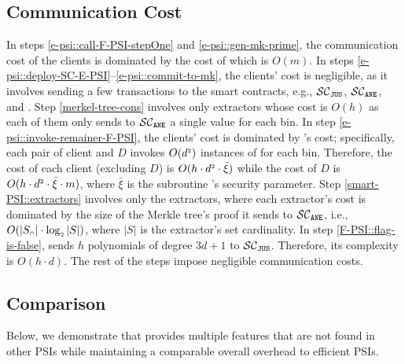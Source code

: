 

\vspace{-5mm}
\subsection{Communication Cost}

\vspace{-2mm}

In steps  \ref{e-psi::call-F-PSI-stepOne} and \ref{e-psi::gen-mk-prime}, the communication cost of the clients is dominated by the cost of \ct which is $O(m)$. In steps \ref{e-psi::deploy-SC-E-PSI}--\ref{e-psi::commit-to-mk}, the clients' cost is negligible, as it involves sending a few transactions to the smart contracts, e.g., $\mathcal{SC}_{\mathtt{JUS}}$, $\mathcal{SC}_{\mathtt{ANE}}$, and \SCpc. Step \ref{merkel-tree-cons} involves only extractors whose cost is $O(h)$ as each of them only sends to $\mathcal{SC}_{\mathtt{ANE}}$  a single value for each bin. In step \ref{e-psi::invoke-remainer-F-PSI}, the clients' cost is dominated by \vopr's cost; specifically, each pair of client and $D$ invokes $O(d^{\scriptscriptstyle 2})$ instances of \vopr for each bin. Therefore, the cost of each client (excluding $D$) is $O(h\cdot d^{\scriptscriptstyle 2}\cdot \bar\xi)$ while the cost of $D$ is $O(h\cdot d^{\scriptscriptstyle 2}\cdot \bar\xi\cdot m)$, where $\bar\xi$ is the subroutine \ole's security parameter. 
%
Step \ref{smart-PSI::extractors}  involves only the extractors, where each extractor's cost is dominated by the size of the Merkle tree's proof it sends to $\mathcal{SC}_{\mathtt{ANE}}$, i.e., $O(|S_{\scriptscriptstyle\cap}|\cdot \log_{\scriptscriptstyle 2}|S|)$, where $|S|$ is the extractor's set cardinality. 
%
In step \ref{F-PSI::flag-is-false}, \aud sends $h$ polynomials of degree $3d+1$ to $\mathcal{SC}_{\mathtt{JUS}}$. Therefore, its complexity is $O(h\cdot d)$. 
%
The rest of the steps impose negligible communication costs. 

\vspace{-4.5mm}
\subsection{Comparison}
\vspace{-1mm}


Below, we demonstrate that \epsi provides multiple features that are not found in other PSIs while maintaining a comparable overall overhead to efficient PSIs.

\vspace{-4.4mm}
